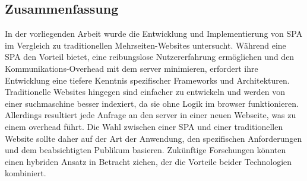\subsection{Zusammenfassung}
In der vorliegenden Arbeit wurde die Entwicklung und Implementierung von \ac{SPA} im Vergleich zu traditionellen Mehrseiten-Websites untersucht.
Während eine \ac{SPA} den Vorteil bietet, eine reibungslose Nutzererfahrung ermöglichen und den Kommunikations-Overhead mit dem \gls{server} minimieren, erfordert ihre Entwicklung eine tiefere Kenntnis spezifischer Frameworks und Architekturen.
Traditionelle Websites hingegen sind einfacher zu entwickeln und werden von einer \gls{suchmaschine} besser indexiert, da sie ohne Logik im \gls{browser} funktionieren.
Allerdings resultiert jede Anfrage an den \gls{server} in einer neuen Webseite, was zu einem \gls{overhead} führt.
Die Wahl zwischen einer \ac{SPA} und einer traditionellen Website sollte daher auf der Art der Anwendung, den spezifischen Anforderungen und dem beabsichtigten Publikum basieren.
Zukünftige Forschungen könnten einen hybriden Ansatz in Betracht ziehen, der die Vorteile beider Technologien kombiniert.